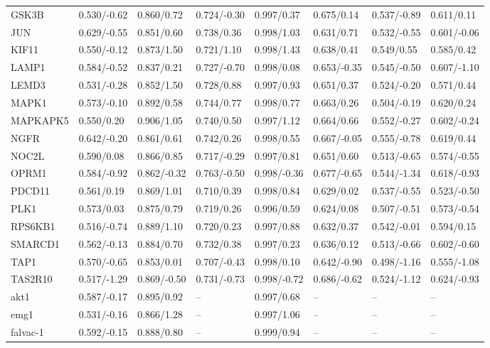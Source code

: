 \begin{footnotesize}
\begin{longtable}{llllllll}
GSK3B & 0.530/-0.62 & 0.860/0.72 & 0.724/-0.30 & 0.997/0.37 & 0.675/0.14 & 0.537/-0.89 & 0.611/0.11 \\
JUN & 0.629/-0.55 & 0.851/0.60 & 0.738/0.36 & 0.998/1.03 & 0.631/0.71 & 0.532/-0.55 & 0.601/-0.06 \\
KIF11 & 0.550/-0.12 & 0.873/1.50 & 0.721/1.10 & 0.998/1.43 & 0.638/0.41 & 0.549/0.55 & 0.585/0.42 \\
LAMP1 & 0.584/-0.52 & 0.837/0.21 & 0.727/-0.70 & 0.998/0.08 & 0.653/-0.35 & 0.545/-0.50 & 0.607/-1.10 \\
LEMD3 & 0.531/-0.28 & 0.852/1.50 & 0.728/0.88 & 0.997/0.93 & 0.651/0.37 & 0.524/-0.20 & 0.571/0.44 \\
MAPK1 & 0.573/-0.10 & 0.892/0.58 & 0.744/0.77 & 0.998/0.77 & 0.663/0.26 & 0.504/-0.19 & 0.620/0.24 \\
MAPKAPK5 & 0.550/0.20 & 0.906/1.05 & 0.740/0.50 & 0.997/1.12 & 0.664/0.66 & 0.552/-0.27 & 0.602/-0.24 \\
NGFR & 0.642/-0.20 & 0.861/0.61 & 0.742/0.26 & 0.998/0.55 & 0.667/-0.05 & 0.555/-0.78 & 0.619/0.44 \\
NOC2L & 0.590/0.08 & 0.866/0.85 & 0.717/-0.29 & 0.997/0.81 & 0.651/0.60 & 0.513/-0.65 & 0.574/-0.55 \\
OPRM1 & 0.584/-0.92 & 0.862/-0.32 & 0.763/-0.50 & 0.998/-0.36 & 0.677/-0.65 & 0.544/-1.34 & 0.618/-0.93 \\
PDCD11 & 0.561/0.19 & 0.869/1.01 & 0.710/0.39 & 0.998/0.84 & 0.629/0.02 & 0.537/-0.55 & 0.523/-0.50 \\
PLK1 & 0.573/0.03 & 0.875/0.79 & 0.719/0.26 & 0.996/0.59 & 0.624/0.08 & 0.507/-0.51 & 0.573/-0.54 \\
RPS6KB1 & 0.516/-0.74 & 0.889/1.10 & 0.720/0.23 & 0.997/0.88 & 0.632/0.37 & 0.542/-0.01 & 0.594/0.15 \\
SMARCD1 & 0.562/-0.13 & 0.884/0.70 & 0.732/0.38 & 0.997/0.23 & 0.636/0.12 & 0.513/-0.66 & 0.602/-0.60 \\
TAP1 & 0.570/-0.65 & 0.853/0.01 & 0.707/-0.43 & 0.998/0.10 & 0.642/-0.90 & 0.498/-1.16 & 0.555/-1.08 \\
TAS2R10 & 0.517/-1.29 & 0.869/-0.50 & 0.731/-0.73 & 0.998/-0.72 & 0.686/-0.62 & 0.524/-1.12 & 0.624/-0.93 \\
akt1 & 0.587/-0.17 & 0.895/0.92 & -- & 0.997/0.68 & -- & -- & -- \\
emg1 & 0.531/-0.16 & 0.866/1.28 & -- & 0.997/1.06 & -- & -- & -- \\
falvac-1 & 0.592/-0.15 & 0.888/0.80 & -- & 0.999/0.94 & -- & -- & -- \\

\end{longtable}
\end{footnotesize}
